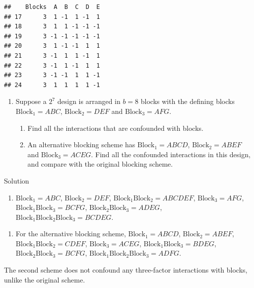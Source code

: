 \documentclass[
]{book}
\providecommand{\tightlist}{%
  \setlength{\itemsep}{0pt}\setlength{\parskip}{0pt}}
\theoremstyle{definition}
\theoremstyle{definition}
\theoremstyle{definition}
\theoremstyle{definition}
\theoremstyle{remark}
\begin{document}
\begin{verbatim}
##    Blocks  A  B  C  D  E
## 17      3  1 -1  1 -1  1
## 18      3  1  1 -1 -1 -1
## 19      3 -1 -1 -1 -1 -1
## 20      3  1 -1 -1  1  1
## 21      3 -1  1  1 -1  1
## 22      3 -1  1 -1  1  1
## 23      3 -1 -1  1  1 -1
## 24      3  1  1  1  1 -1
\end{verbatim}

\begin{enumerate}
\def\labelenumi{\arabic{enumi}.}
\setcounter{enumi}{1}
\item
  Suppose a \(2^7\) design is arranged in \(b=8\) blocks with the defining blocks \(\mathrm{Block}_1 = ABC\), \(\mathrm{Block}_2 = DEF\) and \(\mathrm{Block}_3 = AFG\).

  \begin{enumerate}
  \def\labelenumii{\alph{enumii}.}
  \item
    Find all the interactions that are confounded with blocks.
  \item
    An alternative blocking scheme has \(\mathrm{Block}_1 = ABCD\), \(\mathrm{Block}_2 = ABEF\) and \(\mathrm{Block}_3 = ACEG\). Find all the confounded interactions in this design, and compare with the original blocking scheme.
  \end{enumerate}
\end{enumerate}

Solution

\begin{enumerate}
\def\labelenumi{\alph{enumi}.}
\tightlist
\item
  \(\mathrm{Block}_1 = ABC\), \(\mathrm{Block}_2 = DEF\), \(\mathrm{Block}_1\mathrm{Block}_2 = ABCDEF\), \(\mathrm{Block}_3 = AFG\), \(\mathrm{Block}_1\mathrm{Block}_3 = BCFG\), \(\mathrm{Block}_2\mathrm{Block}_3 = ADEG\), \(\mathrm{Block}_1\mathrm{Block}_2\mathrm{Block}_3 = BCDEG\).
\end{enumerate}

\begin{enumerate}
\def\labelenumi{(\alph{enumi})}
\setcounter{enumi}{1}
\tightlist
\item
  For the alternative blocking scheme, \(\mathrm{Block}_1 = ABCD\), \(\mathrm{Block}_2 = ABEF\), \(\mathrm{Block}_1\mathrm{Block}_2 = CDEF\), \(\mathrm{Block}_3 = ACEG\), \(\mathrm{Block}_1\mathrm{Block}_3 = BDEG\), \(\mathrm{Block}_2\mathrm{Block}_3 = BCFG\), \(\mathrm{Block}_1\mathrm{Block}_2\mathrm{Block}_3 = ADFG\).
\end{enumerate}

The second scheme does not confound any three-factor interactions with blocks, unlike the original scheme.
\end{document}
